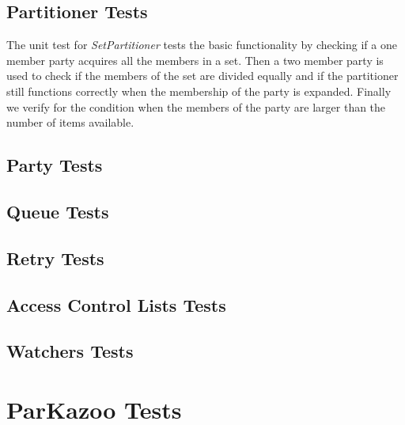 \subsection{Partitioner Tests}
The unit test for \textit{SetPartitioner} tests the basic functionality by checking if a one member party acquires all the members in a set. Then a two member party is used to check if the members of the set are divided equally and if the partitioner still functions correctly when the membership of the party is expanded. Finally we verify for the condition when the members of the party are larger than the number of items available. 

\subsection{Party Tests}

\subsection{Queue Tests}

\subsection{Retry Tests}

\subsection{Access Control Lists Tests}

\subsection{Watchers Tests}

\section{ParKazoo Tests}
